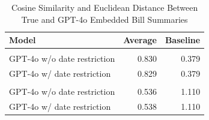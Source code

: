 \begin{table}[!h]
\centering
\caption{Cosine Similarity and Euclidean Distance Between True and GPT-4o Embedded Bill Summaries}
\centering
\begin{tabular}[t]{lrr}
\toprule
Model & Average & Baseline\\
\midrule
\addlinespace[0.3em]
\multicolumn{3}{l}{\textit{Cosine Similarity}}\\
\hspace{1em}GPT-4o w/o date restriction & 0.830 & 0.379\\
\hspace{1em}GPT-4o w/ date restriction & 0.829 & 0.379\\
\midrule
\addlinespace[0.3em]
\multicolumn{3}{l}{\textit{Euclidean Distance}}\\
\hspace{1em}GPT-4o w/o date restriction & 0.536 & 1.110\\
\hspace{1em}GPT-4o w/ date restriction & 0.538 & 1.110\\
\bottomrule
\end{tabular}
\end{table}
